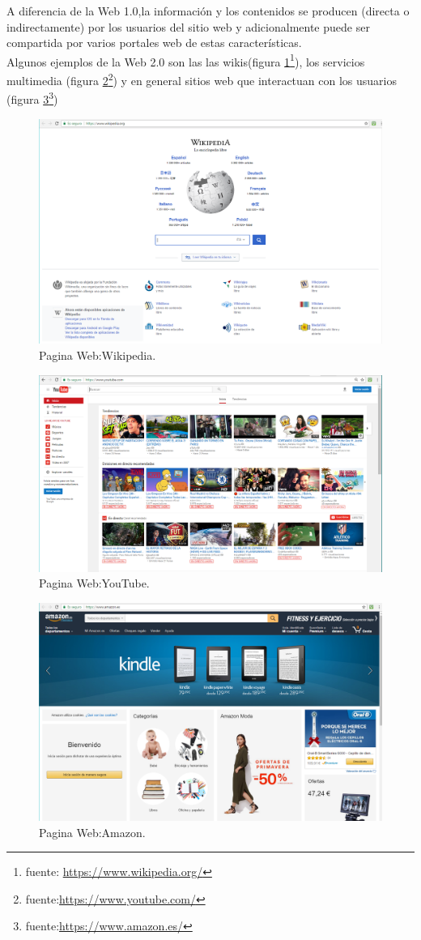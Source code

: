 A diferencia de la Web 1.0,la información y los contenidos se producen (directa o indirectamente) por los usuarios del sitio web y adicionalmente puede ser compartida por varios portales web de estas características.
\\Algunos ejemplos de la Web 2.0 son las las wikis(figura \ref{fig:wikipediaImagen}\footnote{fuente: \url{https://www.wikipedia.org/}}), los servicios multimedia (figura \ref{fig:youtubeImagen}\footnote{fuente:\url{https://www.youtube.com/}}) y en general sitios web que interactuan con los usuarios (figura \ref{fig:amazonImagen}\footnote{fuente:\url{https://www.amazon.es/}})
\begin{figure}[!h]
\centering
\includegraphics[width=0.5\linewidth]{Figures/wikipediaImagen}
\decoRule
\caption[Pagina Web:Wikipedia.]{Pagina Web:Wikipedia.}
\label{fig:wikipediaImagen}
\end{figure}
\begin{figure}[!h]
\centering
\includegraphics[width=0.5\linewidth]{Figures/youtubeImagen}
\decoRule
\caption[Pagina Web:YouTube.]{Pagina Web:YouTube.}
\label{fig:youtubeImagen}
\end{figure}
\begin{figure}[!h]
\centering
\includegraphics[width=0.5\linewidth]{Figures/amazonImagen}
\decoRule
\caption[Pagina Web:Amazon.]{Pagina Web:Amazon.}
\label{fig:amazonImagen}
\end{figure}
